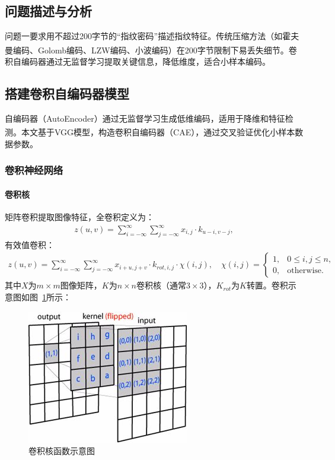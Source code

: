 \documentclass{whutmod}
\newcommand{\upcite}[1]{\textsuperscript{\cite{#1}}}
\begin{document}
        \subsection{问题描述与分析}
            问题一要求用不超过200字节的“指纹密码”描述指纹特征。传统压缩方法（如霍夫曼编码、Golomb编码、LZW编码、小波编码\upcite{7,8,9}）在200字节限制下易丢失细节。卷积自编码器通过无监督学习提取关键信息，降低维度，适合小样本编码。

        \subsection{搭建卷积自编码器模型}
            自编码器（AutoEncoder）通过无监督学习生成低维编码，适用于降维和特征检测\upcite{10}。本文基于VGG模型\upcite{4}，构造卷积自编码器（CAE），通过交叉验证优化小样本数据参数。

            \subsubsection{卷积神经网络}
                \paragraph{卷积核}
                    矩阵卷积提取图像特征，全卷积定义为：
                    \begin{gather}
                        z(u,v) = \sum_{i=-\infty}^{\infty} \sum_{j=-\infty}^{\infty} x_{i,j} \cdot k_{u-i,v-j},
                    \end{gather}
                    有效值卷积：
                    \begin{gather}
                        z(u,v) = \sum_{i=-\infty}^{\infty} \sum_{j=-\infty}^{\infty} x_{i+u,j+v} \cdot k_{rot,i,j} \cdot \chi(i,j), \quad
                        \chi(i,j) = \begin{cases}
                            1, & 0 \leqslant i,j \leqslant n, \\
                            0, & \text{otherwise}.
                        \end{cases}
                    \end{gather}
                    其中$X$为$m \times m$图像矩阵，$K$为$n \times n$卷积核（通常$3 \times 3$），$K_{rot}$为$K$转置。卷积示意图如图~\ref{cnn}所示：

                    \begin{figure}[H]
                        \centering
                        \includegraphics[width=.35\textwidth]{figures/cnn.jpg}
                        \caption{卷积核函数示意图}\label{cnn}
                    \end{figure}
\end{document}
